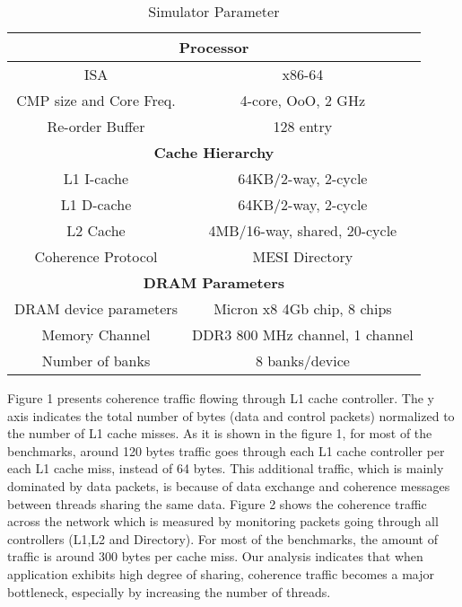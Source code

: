 \begin{table}
  \centering
  \begin{tabular}{||c|c||}
	\hline
	\multicolumn{2}{||c||}{\textbf{Processor}}\\
	\hline
	ISA & x86-64 \\ \hline 
	CMP size and Core Freq. & 4-core, OoO, 2 GHz \\ \hline
	Re-order Buffer & 128 entry \\ \hline
	
	\multicolumn{2}{||c||}{\textbf{Cache Hierarchy}} \\
	\hline
	L1 I-cache & 64KB/2-way, 2-cycle \\ \hline
	L1 D-cache & 64KB/2-way, 2-cycle \\ \hline
	L2 Cache & 4MB/16-way, shared, 20-cycle \\ \hline
	Coherence Protocol & MESI Directory \\
	\hline

    \multicolumn{2}{||c||}{\textbf{DRAM Parameters}} \\
    \hline
    DRAM device parameters & Micron x8 4Gb chip, 8 chips \\ \hline
	Memory Channel & DDR3 800 MHz channel, 1 channel \\ \hline
	Number of banks & 8 banks/device \\ \hline
  \end{tabular}
  \caption{Simulator Parameter}
  \label{table:sim_param}		

\end{table}


Figure 1 presents coherence traffic flowing through L1 cache controller. The y axis indicates the total number of bytes (data and control packets) normalized to the number of L1 cache misses. As it is shown in the figure 1, for most of the benchmarks, around 120 bytes traffic goes through each L1 cache controller per each L1 cache miss, instead of 64 bytes. This additional traffic, which is mainly dominated by data packets, is because of data exchange and coherence messages between threads sharing the same data. Figure 2 shows the coherence traffic across the network which is measured by monitoring packets going through all controllers (L1,L2 and Directory). For most of the benchmarks, the amount of traffic is around 300 bytes per cache miss. Our analysis indicates that when application exhibits high degree of sharing, coherence traffic becomes a major bottleneck, especially by increasing the number of threads.  


